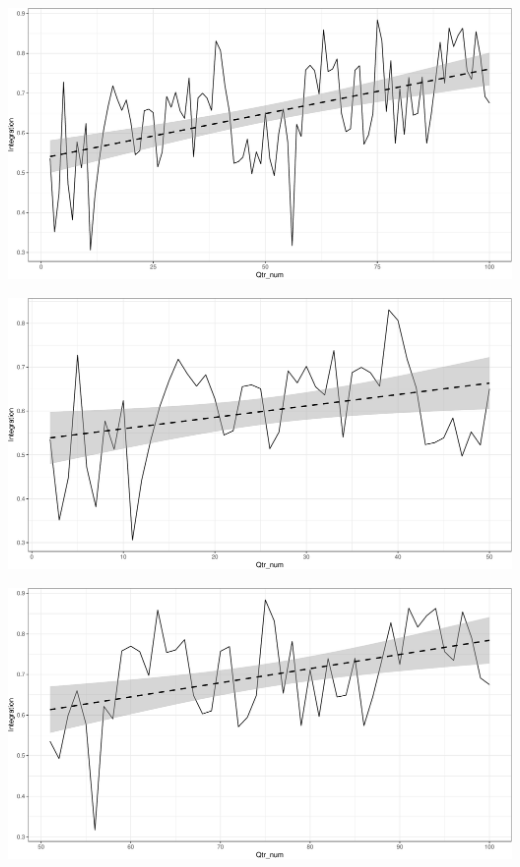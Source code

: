 \documentclass[11pt,]{article}
\begin{document}
\begin{center}\includegraphics{AC_US_Bank_Int_Results_1_files/figure-latex/med_US_bank_int-4} \end{center}

\begin{center}\includegraphics{AC_US_Bank_Int_Results_1_files/figure-latex/med_US_bank_int-5} \end{center}

\begin{center}\includegraphics{AC_US_Bank_Int_Results_1_files/figure-latex/med_US_bank_int-6} \end{center}
\end{document}
